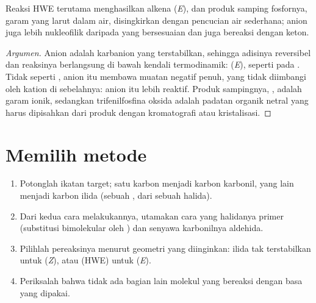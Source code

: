 \begin{proposition}\label{prop:b2:wittig:hwe}
Reaksi HWE terutama menghasilkan alkena (\textit{E}), dan produk samping
fosfornya, garam yang larut dalam air, disingkirkan dengan pencucian air
sederhana; anion  juga lebih nukleofilik daripada  yang bersesuaian dan juga bereaksi dengan keton.
\end{proposition}

\begin{proof}[Argumen]
Anion  adalah karbanion yang terstabilkan, sehingga adisinya
reversibel dan reaksinya berlangsung di bawah kendali termodinamik:
(\textit{E}), seperti pada . Tidak seperti , anion itu membawa muatan negatif penuh, yang tidak diimbangi oleh
kation di sebelahnya: anion itu lebih reaktif. Produk sampingnya,
, adalah garam ionik, sedangkan trifenilfosfina oksida adalah
padatan organik netral yang harus dipisahkan dari produk dengan
kromatografi atau kristalisasi.
\end{proof}

\section{Memilih metode}

\begin{method}\label{met:b2:wittig:wittig-disconnection}
\begin{enumerate}
  \item Potonglah ikatan  target; satu karbon menjadi karbon
        karbonil, yang lain menjadi karbon ilida (sebuah ,
        dari sebuah halida).
  \item Dari kedua cara melakukannya, utamakan cara yang halidanya primer
        (substitusi bimolekular oleh
        ) dan senyawa karbonilnya aldehida.
  \item Pilihlah pereaksinya menurut geometri yang diinginkan: ilida tak
        terstabilkan untuk (\textit{Z}),  atau 
        (HWE) untuk (\textit{E}).
  \item Periksalah bahwa tidak ada bagian lain molekul yang bereaksi dengan
        basa yang dipakai.
\end{enumerate}
\end{method}

